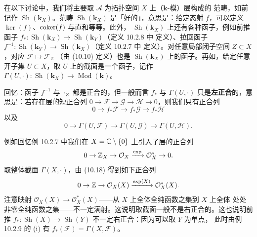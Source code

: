 在以下讨论中，我们将主要取 $\mathcal A$ 为拓扑空间 $X$ 上（$\mathbf{k}$-模）层构成的
范畴，如前记作 $\operatorname{Sh}(\mathbf{k}_X)$。范畴 $\operatorname{Sh}(\mathbf{k}_X)$
是「好的」，意思是：给定态射 $f$，可以定义 $\ker(f)$、$\operatorname{coker}(f)$ 与直和等等。此外，
$\operatorname{Sh}(\mathbf{k}_X)$ 上还有各种函子，例如前推函子
$f_\ast:\operatorname{Sh}(\mathbf{k}_X)\to\operatorname{Sh}(\mathbf{k}_Y)$（定义 10.2.8 中
定义）、拉回函子
$f^{-1}:\operatorname{Sh}(\mathbf{k}_Y)\to\operatorname{Sh}(\mathbf{k}_X)$（定义 10.2.7 中
定义）。对任意局部闭子空间 $Z\subset X$，对应 $\mathcal F\mapsto\mathcal F_Z$
（由 (10.10) 定义）也是 $\operatorname{Sh}(\mathbf{k}_X)$ 上的函子。再如，给定任意开子集
$U\subset X$，取 $U$ 上的截面是一个函子，记作
$\Gamma(U,\cdot):\operatorname{Sh}(\mathbf{k}_X)\to\operatorname{Mod}(\mathbf{k})$。

回忆：函子 $f^{-1}$ 与 $\cdot_Z$ 都是正合的，但一般而言 $f_\ast$ 与
$\Gamma(U,\cdot)$ 只是\textbf{左正合}的，意思是：若存在层的短正合列
$0\to\mathcal F\to\mathcal G\to\mathcal H\to0$，则我们只有正合列
\begin{equation}\tag{10.17}
0\to f_\ast\mathcal F\to f_\ast\mathcal G\to f_\ast\mathcal H
\end{equation}
以及
\begin{equation}\tag{10.18}
0\to\Gamma(U,\mathcal F)\to\Gamma(U,\mathcal G)\to\Gamma(U,\mathcal H).
\end{equation}


例如回忆例 10.2.7 中我们在 $X=\mathbb{C}\setminus\{0\}$ 上引入了层的正合列
\[
0\to\mathbb{Z}_X\to\mathcal O_X\xrightarrow{\exp}\mathcal O_X^*\to0.
\]
取整体截面 $\Gamma(X,\cdot)$，由 (10.18) 得到如下正合列
\[
0\to\mathbb{Z}\to\mathcal O_X(X)\xrightarrow{\exp(X)}\mathcal O_X^*(X).
\]
注意映射 $\mathcal O_X(X)\to\mathcal O_X^*(X)$——从 $X$ 上全体全纯函数之集到 $X$ 上全体
处处非零全纯函数之集——不一定满射。这说明取截面一般不是右正合的。这也说明前推
$f_\ast:\operatorname{Sh}(X)\to\operatorname{Sh}(Y)$ 不一定右正合：因为可以取 $Y$ 为单点，
此时由例 10.2.9 的 (i) 有 $f_\ast(\mathcal F)=\Gamma(X,\mathcal F)$。

